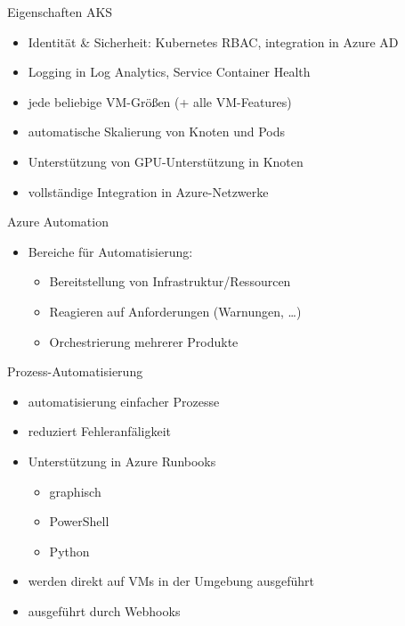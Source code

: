 \begin{flashcard}[]{Eigenschaften AKS}
  \begin{itemize}
    \item Identität \& Sicherheit: Kubernetes RBAC, integration in Azure AD
    \item Logging in Log Analytics, Service Container Health
    \item jede beliebige VM-Größen (+ alle VM-Features)
    \item automatische Skalierung von Knoten und Pods
    \item Unterstützung von GPU-Unterstützung in Knoten
    \item vollständige Integration in Azure-Netzwerke
  \end{itemize}
\end{flashcard}


\begin{flashcard}[]{Azure Automation}
  \begin{itemize}
    \item Bereiche für Automatisierung:
      \begin{itemize}
        \item Bereitstellung von Infrastruktur/Ressourcen
        \item Reagieren auf Anforderungen (Warnungen, \ldots)
        \item Orchestrierung mehrerer Produkte
      \end{itemize}
  \end{itemize}
\end{flashcard}

\begin{flashcard}[]{Prozess-Automatisierung}
  \begin{itemize}
    \item automatisierung einfacher Prozesse
    \item reduziert Fehleranfäligkeit
    \item Unterstützung in Azure Runbooks\newline
      \begin{itemize}
        \item graphisch
        \item PowerShell
        \item Python
      \end{itemize}
    \item werden direkt auf VMs in der Umgebung ausgeführt
    \item ausgeführt durch Webhooks
  \end{itemize}
\end{flashcard}

